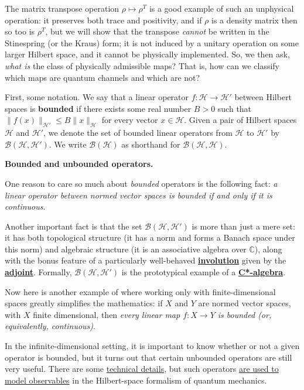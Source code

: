 \documentclass[fleqn,a4paper]{article}
\newenvironment{technical}[1]{\textbf{#1.}\par\vspace{.5\baselineskip}\everypar{\setlength{\parindent}{1.5em}}}{}
\theoremstyle{definition}
\theoremstyle{definition}
\theoremstyle{definition}
\theoremstyle{definition}
\theoremstyle{remark}
\begin{document}
The matrix transpose operation \(\rho\mapsto\rho^T\) is a good example of such an unphysical operation: it preserves both trace and positivity, and if \(\rho\) is a density matrix then so too is \(\rho^T\), but we will show that the transpose \emph{cannot} be written in the Stinespring (or the Kraus) form;
it is not induced by a unitary operation on some larger Hilbert space, and it cannot be physically implemented.
So, we then ask, \emph{what is} the class of physically admissible maps?
That is, how can we classify which maps are quantum channels and which are not?

First, some notation.
We say that a linear operator \(f\colon\mathcal{H}\to\mathcal{H}'\) between Hilbert spaces is \textbf{bounded} if there exists some real number \(B>0\) such that \(\|f(x)\|_{\mathcal{H}'}\leqslant B\|x\|_{\mathcal{H}}\) for every vector \(x\in\mathcal{H}\).
Given a pair of Hilbert spaces \(\mathcal{H}\) and \(\mathcal{H}'\), we denote the set of bounded linear operators from \(\mathcal{H}\) to \(\mathcal{H}'\) by \(\mathcal{B}(\mathcal{H},\mathcal{H}')\).
We write \(\mathcal{B}(\mathcal{H})\) as shorthand for \(\mathcal{B(H,H)}\).

\begin{technical}{Bounded and unbounded operators}
One reason to care so much about \emph{bounded} operators is the following fact: \emph{a linear operator between normed vector spaces is bounded if and only if it is continuous}.

Another important fact is that the set \(\mathcal{B}(\mathcal{H},\mathcal{H}')\) is more than just a mere set: it has both topological structure (it has a norm and forms a Banach space under this norm) and algebraic structure (it is an associative algebra over \(\mathbb{C}\)), along with the bonus feature of a particularly well-behaved \href{https://en.wikipedia.org/wiki/Involution_(mathematics)}{\textbf{involution}} given by the \href{https://en.wikipedia.org/wiki/Hermitian_adjoint}{\textbf{adjoint}}.
Formally, \(\mathcal{B}(\mathcal{H},\mathcal{H}')\) is the prototypical example of a \href{https://en.wikipedia.org/wiki/C*-algebra}{\textbf{C*-algebra}}.

Now here is another example of where working only with finite-dimensional spaces greatly simplifies the mathematics: if \(X\) and \(Y\) are normed vector spaces, with \(X\) finite dimensional, then \emph{every linear map \(f\colon X\to Y\) is bounded (or, equivalently, continuous)}.

In the infinite-dimensional setting, it is important to know whether or not a given operator is bounded, but it turns out that certain unbounded operators are still very useful.
There are some \href{https://en.wikipedia.org/wiki/Unbounded_operator}{technical details}, but such operators \href{https://en.wikipedia.org/wiki/Hilbert_space\#Unbounded_operators}{are used to model observables} in the Hilbert-space formalism of quantum mechanics.

\end{technical}
\end{document}
